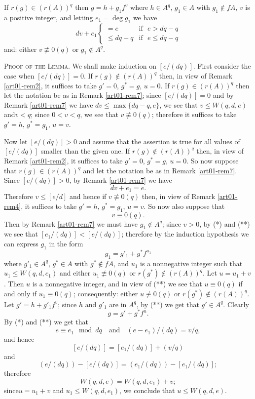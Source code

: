 \begin{remark}\label{art01-rem7}
If $r(g)\in (r(A))^{q}$ then $g=h+g_{1}f^{v}$ where $h\in A^{q}$, $g_{1}\in A$ with $g_{1}\not\in fA$, $v$ is a positive integer, and letting $e_{1}=\deg g_{1}$ we have
$$
dv+e_{1}
\left\{
\begin{array}{ll}
=e & \text{if~ } e>dq-q\\
\leq dq-q & \text{if~ } e\leq dq-q
\end{array}\right.
$$
and: either $v\nequiv 0(q)$ or $g_{1}\not\in A^{q}$.
\end{remark}

\noindent
\textsc{Proof of the Lemma.} We shall make induction on $[e/(dq)]$. First consider the case when $[e/(dq)]=0$. If $r(g)\not\in (r(A))^{q}$ then, in view of Remark \ref{art01-rem2}, it suffices to take $g'=0$, $g^{*}=g$, $u=0$. If $r(g)\in (r(A))^{q}$ then let the notation be as in Remark \ref{art01-rem7}; since $[e/(dq)]=0$ and by Remark \ref{art01-rem7} we have $dv\leq \max \{dq-q,e\}$, we see that $v\leq W(q,d,e)$ and\pageoriginale $v<q$; since $0<v<q$, we see that $v\nequiv 0(q)$; therefore it suffices to take $g'=h$, $g^{*}=g_{1}$, $u=v$.


Now let $[e/(dq)]>0$ and assume that the assertion is true for all values of $[e/(dq)]$ smaller than the given one. If $r(g)\not\in (r(A))^{q}$ then, in view of Remark \ref{art01-rem2}, it suffices to take $g'=0$, $g^{*}=g$, $u=0$. So now suppose that $r(g)\in (r(A))^{q}$ and let the notation be as in Remark \ref{art01-rem7}. Since $[e/(dq)]>0$, by Remark \ref{art01-rem7} we have
\begin{equation*}
dv+e_{1}=e.\tag{*}
\end{equation*}
Therefore $v\leq [e/d]$ and hence if $v\nequiv 0(q)$ then, in view of Remark \ref{art01-rem4}, it suffices to take $g'=h$, $g^{*}=g_{1}$, $u=v$. So now also suppose that
\begin{equation*}
v\equiv 0(q).\tag{**}
\end{equation*}
Then by Remark \ref{art01-rem7} we must have $g_{1}\not\in A^{q}$; since $v>0$, by (*) and (**) we see that $[e_{1}/(dq)]<[e/(dq)]$; therefore by the induction hypothesis we can express $g_{1}$ in the form
$$
g_{1}=g'_{1}+g^{*}f^{u_{1}}
$$
where $g'_{1}\in A^{q}$, $g^{*}\in A$ with $g^{*}\not\in fA$, and $u_{1}$ is a nonnegative integer such that $u_{1}\leq W(q,d,e_{1})$ and either $u_{1}\nequiv 0(q)$ or $r(g^{*})\not\in (r(A))^{q}$. Let $u=u_{1}+v$. Then $u$ is a nonnegative integer, and in view of (**) we see that $u\equiv 0(q)$ if and only if $u_{1}\equiv 0(q)$; consequently: either $u\nequiv 0(q)$ or $r(g^{*})\not\in (r(A))^{q}$. Let $g'=h+g'_{1}f^{v}$; since $h$ and $g'_{1}$ are in $A^{q}$, by (**) we get that $g'\in A^{q}$. Clearly
$$
g=g'+g^{*}f^{u}.
$$
By (*) and (**) we get that
$$
e\equiv e_{1}\mod dq \text{~~ and~~ } (e-e_{1})/(dq)=v/q,
$$
and hence
$$
[e/(dq)]=[e_{1}/(dq)]+(v/q)
$$
and
$$
(e/(dq))-[e/(dq)]=(e_{1}/(dq))-[e_{1}/(dq)];
$$
therefore
$$
W(q,d,e)=W(q,d,e_{1})+v;
$$
since\pageoriginale $u=u_{1}+v$ and $u_{1}\leq W(q,d,e_{1})$, we conclude that $u\leq W(q,d,e)$.


